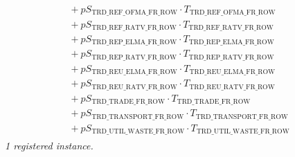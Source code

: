 \documentclass[11pt]{article}
\begin{document}
\begin{align*}
\begin{aligned}
{}+ pS_{\text{TRD\_REF\_OFMA\_FR\_ROW}} \cdot T_{\text{TRD\_REF\_OFMA\_FR\_ROW}}\\
{}+ pS_{\text{TRD\_REF\_RATV\_FR\_ROW}} \cdot T_{\text{TRD\_REF\_RATV\_FR\_ROW}}\\
{}+ pS_{\text{TRD\_REP\_ELMA\_FR\_ROW}} \cdot T_{\text{TRD\_REP\_ELMA\_FR\_ROW}}\\
{}+ pS_{\text{TRD\_REP\_RATV\_FR\_ROW}} \cdot T_{\text{TRD\_REP\_RATV\_FR\_ROW}}\\
{}+ pS_{\text{TRD\_REU\_ELMA\_FR\_ROW}} \cdot T_{\text{TRD\_REU\_ELMA\_FR\_ROW}}\\
{}+ pS_{\text{TRD\_REU\_RATV\_FR\_ROW}} \cdot T_{\text{TRD\_REU\_RATV\_FR\_ROW}}\\
{}+ pS_{\text{TRD\_TRADE\_FR\_ROW}} \cdot T_{\text{TRD\_TRADE\_FR\_ROW}}\\
{}+ pS_{\text{TRD\_TRANSPORT\_FR\_ROW}} \cdot T_{\text{TRD\_TRANSPORT\_FR\_ROW}}\\
{}+ pS_{\text{TRD\_UTIL\_WASTE\_FR\_ROW}} \cdot T_{\text{TRD\_UTIL\_WASTE\_FR\_ROW}}
\end{aligned}
\end{align*}
\noindent\emph{1 registered instance.}\par
\end{document}
